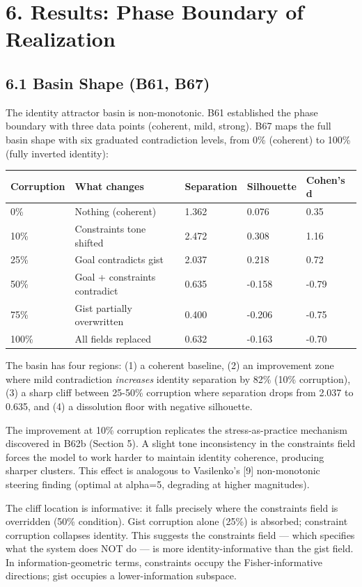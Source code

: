 \documentclass[11pt]{article}
\begin{document}
\section{6. Results: Phase Boundary of Realization}

\subsection{6.1 Basin Shape (B61, B67)}

The identity attractor basin is non-monotonic. B61 established the phase
boundary with three data points (coherent, mild, strong). B67 maps the full
basin shape with six graduated contradiction levels, from 0\% (coherent) to
100\% (fully inverted identity):

\begin{table}[h]\centering
\begin{tabular}{lllll}
\toprule
Corruption & What changes & Separation & Silhouette & Cohen's d \\
\midrule
0\% & Nothing (coherent) & 1.362 & 0.076 & 0.35 \\
10\% & Constraints tone shifted & 2.472 & 0.308 & 1.16 \\
25\% & Goal contradicts gist & 2.037 & 0.218 & 0.72 \\
50\% & Goal + constraints contradict & 0.635 & -0.158 & -0.79 \\
75\% & Gist partially overwritten & 0.400 & -0.206 & -0.75 \\
100\% & All fields replaced & 0.632 & -0.163 & -0.70 \\
\bottomrule
\end{tabular}
\end{table}

The basin has four regions: (1) a coherent baseline, (2) an improvement zone
where mild contradiction \textit{increases} identity separation by 82\% (10\% corruption),
(3) a sharp cliff between 25-50\% corruption where separation drops from 2.037
to 0.635, and (4) a dissolution floor with negative silhouette.

The improvement at 10\% corruption replicates the stress-as-practice mechanism
discovered in B62b (Section 5). A slight tone inconsistency in the constraints
field forces the model to work harder to maintain identity coherence, producing
sharper clusters. This effect is analogous to Vasilenko's [9] non-monotonic
steering finding (optimal at alpha=5, degrading at higher magnitudes).

The cliff location is informative: it falls precisely where the constraints
field is overridden (50\% condition). Gist corruption alone (25\%) is absorbed;
constraint corruption collapses identity. This suggests the constraints field ---
which specifies what the system does NOT do --- is more identity-informative than
the gist field. In information-geometric terms, constraints occupy the
Fisher-informative directions; gist occupies a lower-information subspace.
\end{document}
